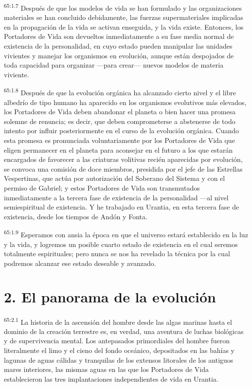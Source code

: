 \par
\textsuperscript{65:1.7} Después de que los modelos de vida se han formulado y las organizaciones materiales se han concluido debidamente, las fuerzas supermateriales implicadas en la propagación de la vida se activan enseguida, y la vida existe. Entonces, los Portadores de Vida son devueltos inmediatamente a su fase media normal de existencia de la personalidad, en cuyo estado pueden manipular las unidades vivientes y manejar los organismos en evolución, aunque están despojados de toda capacidad para organizar ---para crear--- nuevos modelos de materia viviente.

\par
\textsuperscript{65:1.8} Después de que la evolución orgánica ha alcanzado cierto nivel y el libre albedrío de tipo humano ha aparecido en los organismos evolutivos más elevados, los Portadores de Vida deben abandonar el planeta o bien hacer una promesa solemne de renuncia; es decir, que deben comprometerse a abstenerse de todo intento por influir posteriormente en el curso de la evolución orgánica. Cuando esta promesa es pronunciada voluntariamente por los Portadores de Vida que eligen permanecer en el planeta para aconsejar en el futuro a los que estarán encargados de favorecer a las criaturas volitivas recién aparecidas por evolución, se convoca una comisión de doce miembros, presidida por el jefe de las Estrellas Vespertinas, que actúa por autorización del Soberano del Sistema y con el permiso de Gabriel; y estos Portadores de Vida son transmutados inmediatamente a la tercera fase de existencia de la personalidad ---al nivel semiespiritual de existencia. Y he trabajado en Urantia, en esta tercera fase de existencia, desde los tiempos de Andón y Fonta.

\par
\textsuperscript{65:1.9} Esperamos con ansia la época en que el universo estará establecido en la luz y la vida, y logremos un posible cuarto estado de existencia en el cual seremos totalmente espirituales; pero nunca se nos ha revelado la técnica por la cual podremos alcanzar ese estado deseable y avanzado.

\section*{2. El panorama de la evolución}
\par
\textsuperscript{65:2.1} La historia de la ascensión del hombre desde las algas marinas hasta el dominio de la creación terrestre es, en verdad, una aventura de luchas biológicas y de supervivencia mental. Los antepasados primordiales del hombre fueron literalmente el limo y el cieno del fondo oceánico, depositados en las bahías y lagunas de aguas cálidas y tranquilas de los extensos litorales de los antiguos mares interiores, las mismas aguas en las que los Portadores de Vida establecieron las tres implantaciones independientes de vida en Urantia.

